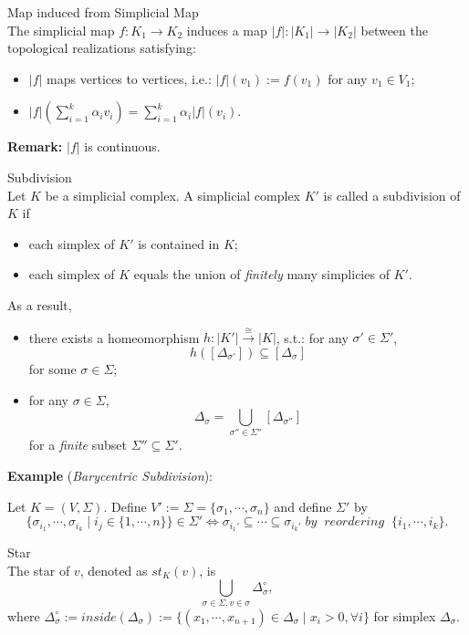 \begin{definition}{Map induced from Simplicial Map}\\
The simplicial map $f : K_1 \rightarrow K_2$ induces a map $|f| :|K_1| \rightarrow |K_2|$ between the topological realizations satisfying:
\begin{itemize}
    \item $|f|$ maps vertices to vertices, i.e.: $|f| (v_1) := f(v_1)$ for any $v_1 \in V_1$;
    \item $|f| (\sum_{i=1}^k \alpha_i v_i) = \sum_{i=1}^k \alpha_i |f| (v_i)$.
\end{itemize}
\end{definition}

\noindent\textbf{Remark:} $|f|$ is continuous.

\begin{definition}{Subdivision}\\
Let $K$ be a simplicial complex. A simplicial complex $K'$ is called a subdivision of $K$ if
\begin{itemize}
    \item each simplex of $K'$ is contained in $K$;
    \item each simplex of $K$ equals the union of \textit{finitely} many simplicies of $K'$.
\end{itemize}
As a result, 
\begin{itemize}
    \item there exists a homeomorphism $h : |K'| \overset{\cong}{\rightarrow} |K|$, s.t.: for any $\sigma' \in \Sigma'$,
    $$h([\Delta_{\sigma'}]) \subseteq [\Delta_\sigma]$$
    for some $\sigma \in \Sigma$;
    \item for any $\sigma \in \Sigma$,
    $$\Delta_\sigma = \bigcup_{\sigma'' \in \Sigma''} [\Delta_{\sigma''}]$$
    for a \textit{finite} subset $\Sigma'' \subseteq \Sigma'$.
\end{itemize}
\end{definition}


\noindent\textbf{Example} (\textit{Barycentric Subdivision}):

Let $K=(V,\Sigma)$. Define $V' := \Sigma= \{ \sigma_1, \cdots, \sigma_n \}$ and define $\Sigma'$ by
$$\{ \sigma_{i_1},\cdots, \sigma_{i_k} \mid i_j \in \{1,\cdots,n\} \} \in \Sigma' \Leftrightarrow \sigma_{i_1'} \subseteq \cdots \subseteq \sigma_{i_k'} \;by\;\;reordering\;\; \{i_1,\cdots, i_k\}.$$


\begin{definition}{Star}\\
The star of $v$, denoted as $st_K(v)$, is
$$\bigcup_{\sigma \in \Sigma,v \in \sigma} \Delta_\sigma^\circ ,$$
where $\Delta_\sigma^\circ := inside(\Delta_\sigma) := \{ (x_1,\cdots,x_{n+1}) \in \Delta_\sigma \mid x_i > 0, \forall i \}$ for simplex $\Delta_\sigma$.
\end{definition}

